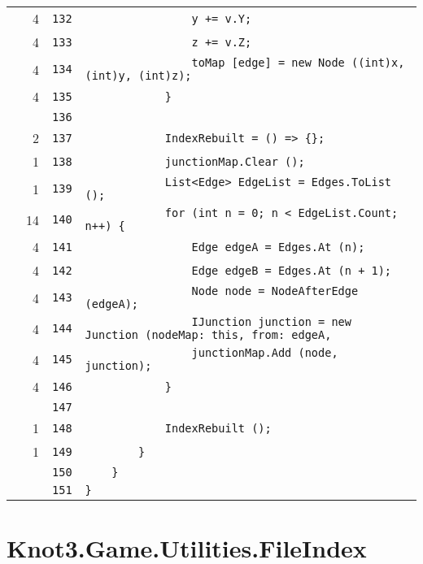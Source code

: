 \documentclass[a4paper,10pt]{article}
\begin{document}
\begin{longtable}[l]{lrrl}
\cellcolor{green} & 4 & \verb~132~ & \verb~                y += v.Y;~\\
\cellcolor{green} & 4 & \verb~133~ & \verb~                z += v.Z;~\\
\cellcolor{green} & 4 & \verb~134~ & \verb~                toMap [edge] = new Node ((int)x, (int)y, (int)z);~\\
\cellcolor{green} & 4 & \verb~135~ & \verb~            }~\\
\cellcolor{gray} &  & \verb~136~ & \verb~~\\
\cellcolor{green} & 2 & \verb~137~ & \verb~            IndexRebuilt = () => {};~\\
\cellcolor{green} & 1 & \verb~138~ & \verb~            junctionMap.Clear ();~\\
\cellcolor{green} & 1 & \verb~139~ & \verb~            List<Edge> EdgeList = Edges.ToList ();~\\
\cellcolor{green} & 14 & \verb~140~ & \verb~            for (int n = 0; n < EdgeList.Count; n++) {~\\
\cellcolor{green} & 4 & \verb~141~ & \verb~                Edge edgeA = Edges.At (n);~\\
\cellcolor{green} & 4 & \verb~142~ & \verb~                Edge edgeB = Edges.At (n + 1);~\\
\cellcolor{green} & 4 & \verb~143~ & \verb~                Node node = NodeAfterEdge (edgeA);~\\
\cellcolor{green} & 4 & \verb~144~ & \verb~                IJunction junction = new Junction (nodeMap: this, from: edgeA,~\\
\cellcolor{green} & 4 & \verb~145~ & \verb~                junctionMap.Add (node, junction);~\\
\cellcolor{green} & 4 & \verb~146~ & \verb~            }~\\
\cellcolor{gray} &  & \verb~147~ & \verb~~\\
\cellcolor{green} & 1 & \verb~148~ & \verb~            IndexRebuilt ();~\\
\cellcolor{green} & 1 & \verb~149~ & \verb~        }~\\
\cellcolor{gray} &  & \verb~150~ & \verb~    }~\\
\cellcolor{gray} &  & \verb~151~ & \verb~}~\\
\end{longtable}
\newpage
\section{Knot3.Game.Utilities.FileIndex}
\end{document}
